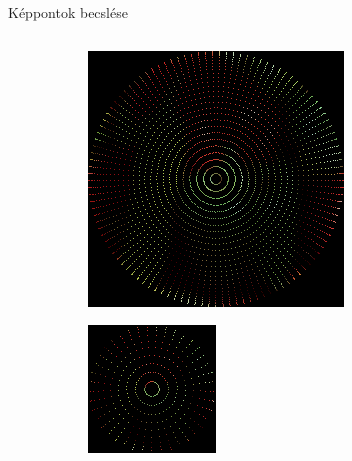 \documentclass{beamer}
\begin{document}
\begin{frame}{Képpontok becslése}
\begin{columns}
\begin{column}{0.5\textwidth}
\begin{figure}
\begin{subfigure}{.48\textwidth}
            \end{subfigure}
            \begin{subfigure}{.48\textwidth}
                \centering
            \includegraphics[width=\textwidth]{figures/pepper_bilinear.png}
            \end{subfigure}
            \begin{subfigure}{.48\textwidth}
                \centering
            \includegraphics[width=\textwidth]{figures/pepper_integral.png}

\end{subfigure}
\end{figure}
\end{column}
\end{columns}
\end{frame}
\end{document}
